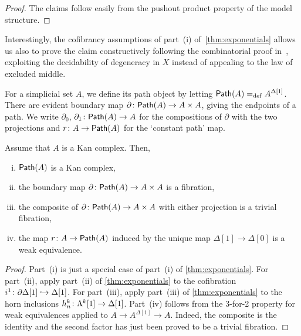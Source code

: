 \documentclass[reqno,10pt,a4paper,oneside,draft]{amsart}
\begin{document}
\begin{proof} The claims follow easily from the pushout product property of the model structure.
\end{proof}
 
Interestingly, the cofibrancy assumptions of part~(i) of~\cref{thm:exponentials} allows
us also to prove the claim constructively following the combinatorial proof in~\cite{MayJP:simoat}, exploiting the decidability of degeneracy in $X$ instead of appealing to the law of excluded middle.




For a simplicial set $A$, we define its path object by letting $\mathsf{Path}(A) =_{\operatorname{def}} A^{\Delta[1]}$. 
There are evident boundary map $\partial \colon \mathsf{Path}(A) \to A \times A$, giving
the endpoints of a path. We write $\partial_0$, $\partial_1 \colon \mathsf{Path}(A) \to A$ for the compositions of $\partial$
with the two projections and $r \colon A \to \mathsf{Path}(A)$ for the `constant path' map.



\begin{proposition} \label{thm:id-types-for-types}
Assume that $A$ is a Kan complex. Then,
\begin{enumerate}[(i)] 
\item $\mathsf{Path}(A)$ is a Kan complex,
\item the boundary map $\partial  \colon \mathsf{Path}(A) \rightarrow A \times A$ is a fibration,
\item the composite of $\partial \colon \mathsf{Path}(A) \rightarrow A \times A$ with either projection is a trivial fibration,
\item the map $r \colon A \rightarrow \mathsf{Path}(A)$ induced by the unique map $\Delta[1] \rightarrow \Delta[0]$ is a weak equivalence.
\end{enumerate}
\end{proposition} 

\begin{proof}
Part~(i) is just a special case of part~(i) of \cref{thm:exponentials}. For part~(ii), apply part~(ii) of \cref{thm:exponentials} to the cofibration $i^1 \colon \partial \Delta[1]  \hookrightarrow \Delta[1]$. For part~(iii), apply part~(iii) of \cref{thm:exponentials} to the horn inclusions $h^k_n \colon \Lambda^k[1]  \rightarrow \Delta[1]$. Part~(iv) follows from the 3-for-2 property for weak equivalences applied to $A \rightarrow A^{\Delta[1]} \rightarrow A$. Indeed, the
composite is the identity and the second factor has just been proved to be a trivial fibration.
\end{proof}
\end{document}

